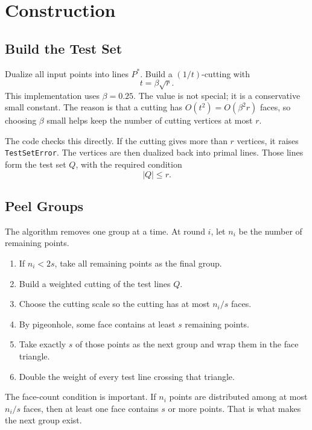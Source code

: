 \documentclass[11pt,a4paper]{article}
\begin{document}
\section{Construction}
\label{sec:algorithm}

\subsection{Build the Test Set}

Dualize all input points into lines $P^*$. Build a $(1/t)$-cutting
with
\[
  t=\beta\sqrt r.
\]
This implementation uses $\beta=0.25$. The value is not special; it
is a conservative small constant. The reason is that a cutting has
$O(t^2)=O(\beta^2 r)$ faces, so choosing $\beta$ small helps keep the
number of cutting vertices at most $r$.

The code checks this directly. If the cutting gives more than $r$
vertices, it raises \texttt{TestSetError}. The vertices are then
dualized back into primal lines. Those lines form the test set $Q$,
with the required condition
\[
  |Q|\le r.
\]

\subsection{Peel Groups}

The algorithm removes one group at a time. At round $i$, let $n_i$ be
the number of remaining points.

\begin{enumerate}[nosep,leftmargin=*]
  \item If $n_i<2s$, take all remaining points as the final group.
  \item Build a weighted cutting of the test lines $Q$.
  \item Choose the cutting scale so the cutting has at most $n_i/s$
        faces.
  \item By pigeonhole, some face contains at least $s$ remaining
        points.
  \item Take exactly $s$ of those points as the next group and wrap
        them in the face triangle.
  \item Double the weight of every test line crossing that triangle.
\end{enumerate}

The face-count condition is important. If $n_i$ points are distributed
among at most $n_i/s$ faces, then at least one face contains $s$ or
more points. That is what makes the next group exist.
\end{document}
